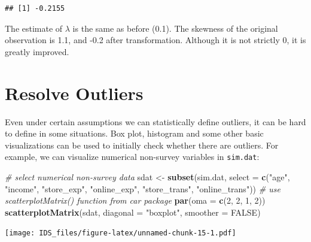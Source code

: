 \documentclass[12pt,]{krantz}
\makeatletter
\newenvironment{Shaded}{\begin{snugshade}}{\end{snugshade}}
\newcommand{\CommentTok}[1]{\textcolor[rgb]{0.37,0.37,0.37}{\textit{#1}}}
\newcommand{\DataTypeTok}[1]{\textcolor[rgb]{0.27,0.27,0.27}{#1}}
\newcommand{\DecValTok}[1]{\textcolor[rgb]{0.06,0.06,0.06}{#1}}
\newcommand{\KeywordTok}[1]{\textcolor[rgb]{0.27,0.27,0.27}{\textbf{#1}}}
\newcommand{\NormalTok}[1]{#1}
\newcommand{\OperatorTok}[1]{\textcolor[rgb]{0.43,0.43,0.43}{\textbf{#1}}}
\newcommand{\OtherTok}[1]{\textcolor[rgb]{0.37,0.37,0.37}{#1}}
\newcommand{\StringTok}[1]{\textcolor[rgb]{0.5,0.5,0.5}{#1}}
\newenvironment{kframe}{%
\medskip{}
\setlength{\fboxsep}{.8em}
 \def\at@end@of@kframe{}%
 \ifinner\ifhmode%
  \def\at@end@of@kframe{\end{minipage}}%
  \begin{minipage}{\columnwidth}%
 \fi\fi%
 \def\FrameCommand##1{\hskip\@totalleftmargin \hskip-\fboxsep
 \colorbox{shadecolor}{##1}\hskip-\fboxsep
     \hskip-\linewidth \hskip-\@totalleftmargin \hskip\columnwidth}%
 \MakeFramed {\advance\hsize-\width
   \@totalleftmargin\z@ \linewidth\hsize
   \@setminipage}}%
 {\par\unskip\endMakeFramed%
 \at@end@of@kframe}
\renewenvironment{Shaded}{\begin{kframe}}{\end{kframe}}
\makeatother
\begin{document}
\begin{Shaded}
\end{Shaded}

\begin{verbatim}
## [1] -0.2155
\end{verbatim}

The estimate of \(\lambda\) is the same as before (0.1). The skewness of the original observation is 1.1, and -0.2 after transformation. Although it is not strictly 0, it is greatly improved.

\hypertarget{resolve-outliers}{%
\section{Resolve Outliers}\label{resolve-outliers}}

Even under certain assumptions we can statistically define outliers, it can be hard to define in some situations. Box plot, histogram and some other basic visualizations can be used to initially check whether there are outliers. For example, we can visualize numerical non-survey variables in \texttt{sim.dat}:

\begin{Shaded}
\begin{Highlighting}[]
\CommentTok{# select numerical non-survey data}
\NormalTok{sdat <-}\StringTok{ }\KeywordTok{subset}\NormalTok{(sim.dat, }\DataTypeTok{select =} \KeywordTok{c}\NormalTok{(}\StringTok{"age"}\NormalTok{, }\StringTok{"income"}\NormalTok{, }\StringTok{"store_exp"}\NormalTok{, }
    \StringTok{"online_exp"}\NormalTok{, }\StringTok{"store_trans"}\NormalTok{, }\StringTok{"online_trans"}\NormalTok{))}
\CommentTok{# use scatterplotMatrix() function from car package}
\KeywordTok{par}\NormalTok{(}\DataTypeTok{oma =} \KeywordTok{c}\NormalTok{(}\DecValTok{2}\NormalTok{, }\DecValTok{2}\NormalTok{, }\DecValTok{1}\NormalTok{, }\DecValTok{2}\NormalTok{))}
\KeywordTok{scatterplotMatrix}\NormalTok{(sdat, }\DataTypeTok{diagonal =} \StringTok{"boxplot"}\NormalTok{, }\DataTypeTok{smoother =} \OtherTok{FALSE}\NormalTok{)}
\end{Highlighting}
\end{Shaded}

\texttt{[image: IDS\_files/figure-latex/unnamed-chunk-15-1.pdf]}
\end{document}
